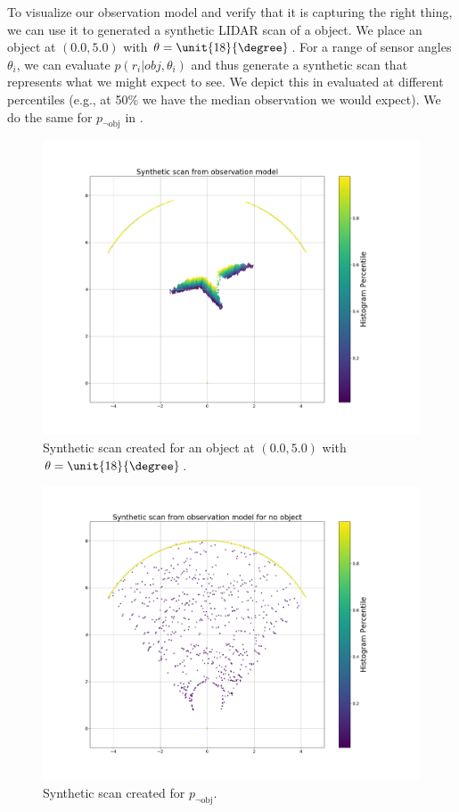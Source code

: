 To visualize our observation model and verify that it is capturing the right
thing, we can use it to generated a synthetic LIDAR scan of a object. We place
an object at $(0.0, 5.0)$ with $\theta = \unit{18}{\degree}$. For a range of
sensor angles $\theta_i$, we can evaluate $p( r_i | obj, \theta_i ) $ and thus
generate a synthetic scan that represents what we might expect to see. We depict
this in  evaluated at different percentiles (e.g., at
50\% we have the median observation we would expect). We do the same for
$p_{\lnot \text{obj}}$ in .
%
\begin{figure}
  \centering
  \includegraphics[width=\columnwidth]{figures/synthetic_scan.png}
  \caption{Synthetic scan created for an object at $(0.0, 5.0)$ with $\theta =
    \unit{18}{\degree}$.}
  \label{fig:synthetic_scan}
\end{figure}
%
\begin{figure}
  \centering
  \includegraphics[width=\columnwidth]{figures/synthetic_scan_noobj.png}
  \caption{Synthetic scan created for $p_{\lnot \text{obj}}$.}
  \label{fig:synthetic_scan_noobj}
\end{figure}
